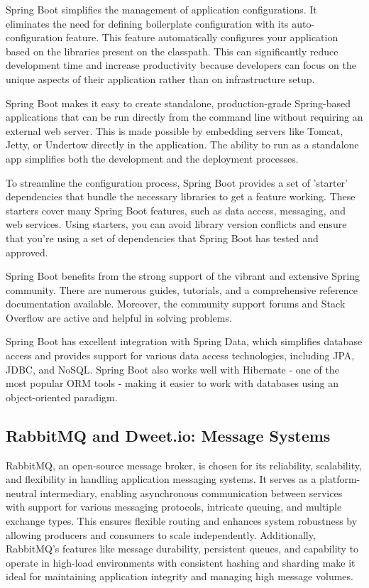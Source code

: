 Spring Boot simplifies the management of application configurations. 
It eliminates the need for defining boilerplate configuration with its auto-configuration feature.
This feature automatically configures your application based on the libraries present on the classpath. 
This can significantly reduce development time and increase productivity because developers can focus on the unique aspects of their application rather than on infrastructure setup. 

Spring Boot makes it easy to create standalone, production-grade Spring-based applications that can be run directly from the command line without requiring an external web server. 
This is made possible by embedding servers like Tomcat, Jetty, or Undertow directly in the application. 
The ability to run as a standalone app simplifies both the development and the deployment processes.

To streamline the configuration process, Spring Boot provides a set of 'starter' dependencies that bundle the necessary libraries to get a feature working. 
These starters cover many Spring Boot features, such as data access, messaging, and web services. 
Using starters, you can avoid library version conflicts and ensure that you're using a set of dependencies that Spring Boot has tested and approved.

Spring Boot benefits from the strong support of the vibrant and extensive Spring community. 
There are numerous guides, tutorials, and a comprehensive reference documentation available. 
Moreover, the community support forums and Stack Overflow are active and helpful in solving problems.

Spring Boot has excellent integration with Spring Data, which simplifies database access and provides support for various data access technologies, including JPA, JDBC, and NoSQL. 
Spring Boot also works well with Hibernate - one of the most popular ORM tools - making it easier to work with databases using an object-oriented paradigm.

\subsection{RabbitMQ and Dweet.io: Message Systems}

RabbitMQ, an open-source message broker, is chosen for its reliability, scalability, and flexibility in handling application messaging systems.\cite{RabbitamqpSpec} It serves as a platform-neutral intermediary, enabling asynchronous communication between services with support for various messaging protocols, intricate queuing, and multiple exchange types. This ensures flexible routing and enhances system robustness by allowing producers and consumers to scale independently. Additionally, RabbitMQ's features like message durability, persistent queues, and capability to operate in high-load environments with consistent hashing and sharding make it ideal for maintaining application integrity and managing high message volumes.


